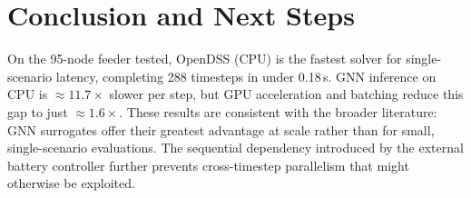 \documentclass[11pt]{article}
\begin{document}
\section{Conclusion and Next Steps}

On the 95-node feeder tested, OpenDSS (CPU) is the fastest solver for
single-scenario latency, completing 288 timesteps in under 0.18\,s.
GNN inference on CPU is ${\approx}11.7\times$ slower per step, but GPU
acceleration and batching reduce this gap to just ${\approx}1.6\times$.
These results are consistent with the broader literature: GNN surrogates
offer their greatest advantage at scale rather than for small,
single-scenario evaluations.  The sequential dependency introduced by the
external battery controller further prevents cross-timestep parallelism
that might otherwise be exploited.
\end{document}
